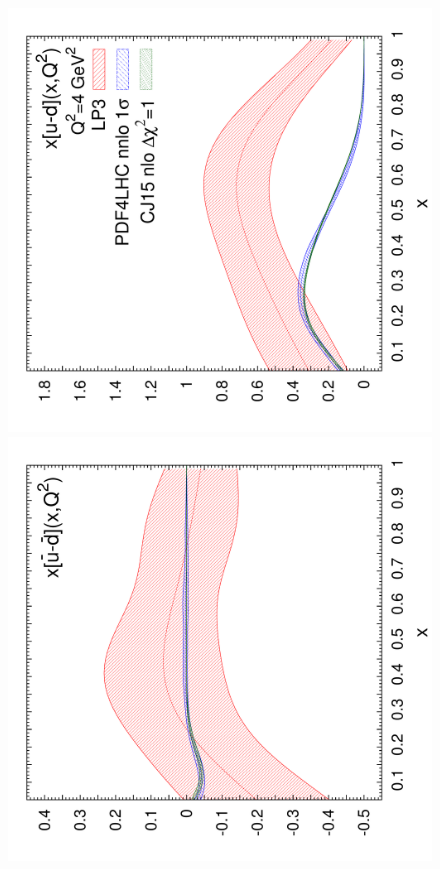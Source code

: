 \begin{figure}[!t]
\centering
\includegraphics[scale=0.22,angle=270]{plots/unpxq}
\includegraphics[scale=0.22,angle=270]{plots/unpxqbar}\\

\end{figure}
